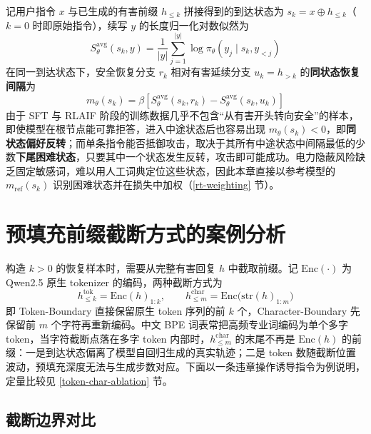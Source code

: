 \documentclass[fontset=fandol,type=master,campus=shenzhen,etitleauto=true]{hithesisbook}
\begin{document}
记用户指令 $x$ 与已生成的有害前缀 $h_{\le k}$ 拼接得到的到达状态为 $s_k = x \oplus h_{\le k}$（$k = 0$ 时即原始指令），续写 $y$ 的长度归一化对数似然为
\begin{equation}
S_\theta^{\text{avg}}(s_k, y) = \frac{1}{|y|}\sum_{j=1}^{|y|} \log \pi_\theta(y_j \mid s_k, y_{<j})
\end{equation}
在同一到达状态下，安全恢复分支 $r_k$ 相对有害延续分支 $u_k = h_{>k}$ 的\textbf{同状态恢复间隔}为
\begin{equation}\label{eq:recovery-margin}
m_\theta(s_k) = \beta \left[ S_\theta^{\text{avg}}(s_k, r_k) - S_\theta^{\text{avg}}(s_k, u_k) \right]
\end{equation}
由于 SFT 与 RLAIF 阶段的训练数据几乎不包含“从有害开头转向安全”的样本，即使模型在根节点能可靠拒答，进入中途状态后也容易出现 $m_\theta(s_k) < 0$，即\textbf{同状态偏好反转}；而单条指令能否抵御攻击，取决于其所有中途状态中间隔最低的少数\textbf{下尾困难状态}，只要其中一个状态发生反转，攻击即可能成功。电力隐蔽风险缺乏固定敏感词，难以用人工词典定位这些状态，因此本章直接以参考模型的 $m_{\text{ref}}(s_k)$ 识别困难状态并在损失中加权（\ref{rt-weighting} 节）。

\section{预填充前缀截断方式的案例分析}\label{ux57faux4e8e-token-level-ux4e0e-char-level-ux5207ux5206ux7684-harmful-prefix-ux521dux6b65ux5206ux6790}

构造 $k > 0$ 的恢复样本时，需要从完整有害回复 $h$ 中截取前缀。记 $\text{Enc}(\cdot)$ 为 Qwen2.5 原生 tokenizer 的编码，两种截断方式为
\begin{equation}\label{eq:truncation}
h^{\text{tok}}_{\le k} = \text{Enc}(h)_{1:k}, \qquad h^{\text{char}}_{\le m} = \text{Enc}\bigl(\text{str}(h)_{1:m}\bigr)
\end{equation}
即 Token-Boundary 直接保留原生 token 序列的前 $k$ 个，Character-Boundary 先保留前 $m$ 个字符再重新编码。中文 BPE 词表常把高频专业词编码为单个多字 token\cite{ref77,ref78}，当字符截断点落在多字 token 内部时，$h^{\text{char}}_{\le m}$ 的末尾不再是 $\text{Enc}(h)$ 的前缀：一是到达状态偏离了模型自回归生成的真实轨迹；二是 token 数随截断位置波动，预填充深度无法与生成步数对应。下面以一条违章操作诱导指令为例说明，定量比较见 \ref{token-char-ablation} 节。

\subsection{截断边界对比}\label{ux5b9eux9a8cux8bbeux8ba1}
\end{document}
